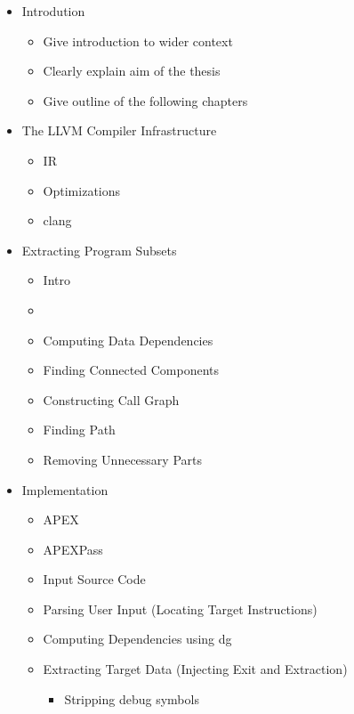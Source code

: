 \documentclass[12pt, twoside]{fithesis2}
\renewcommand{\_}{\leavevmode \kern0.07em\vbox{\hrule width0.4em}}
\newcommand{\squarebullet}{\textcolor{black}{\raisebox{0.15em}{\rule{4pt}{4pt}}}}
\newenvironment{myItemize}{
  \begin{itemize}[
    leftmargin=2em,
    rightmargin=1em,
    itemsep=\parskip,
    parsep=0em,
    topsep=0em,
    partopsep=0em
]
  \renewcommand{\labelitemi}{\squarebullet}
  \renewcommand{\labelitemii}{\textbullet}
}{
  \end{itemize}
}
\begin{document}
\begin{myItemize}

\item Introdution
    \begin{myItemize}
    \item Give introduction to wider context
    \item Clearly explain aim of the thesis
    \item Give outline of the following chapters
    \end{myItemize}

\item The LLVM Compiler Infrastructure
    \begin{myItemize}
    \item IR
    \item Optimizations
    \item clang
    \end{myItemize}

\item Extracting Program Subsets
    \begin{myItemize}
    \item Intro
    \item
    \item Computing Data Dependencies
    \item Finding Connected Components
    \item Constructing Call Graph
    \item Finding Path
    \item Removing Unnecessary Parts
    \end{myItemize}

\item Implementation
    \begin{myItemize}
    \item APEX
    \item APEXPass
    \item Input Source Code
    \item Parsing User Input (Locating Target Instructions)
    \item Computing Dependencies using dg
    \item Extracting Target Data (Injecting Exit and Extraction)
        \begin{myItemize}
        \item Stripping debug symbols
        \end{myItemize}
    \end{myItemize}


\end{myItemize}
\end{document}
